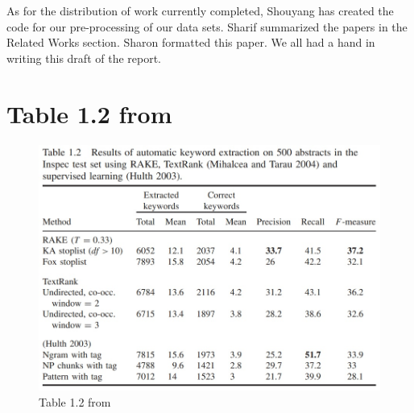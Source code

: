\documentclass[11pt,a4paper]{article}
\begin{document}
As for the distribution of work currently completed, Shouyang has created the code for our pre-processing of our data sets. Sharif summarized the papers in the Related Works section. Sharon formatted this paper. We all had a hand in writing this draft of the report. 

%
%



\appendix

\section{Table 1.2 from \citet{1}}
\begin{figure}[b!]
  \centering
  \includegraphics[width=\linewidth]{table1-2.jpg}
  \caption{Table 1.2 from \citet{1}}
\end{figure}
\end{document}
